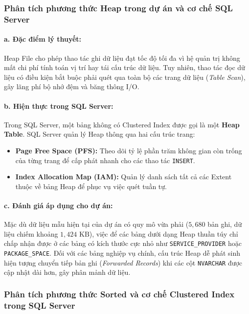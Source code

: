 \subsubsection{Phân tích phương thức Heap trong dự án và cơ chế SQL Server}

\paragraph{a. Đặc điểm lý thuyết:}
Heap File cho phép thao tác ghi dữ liệu đạt tốc độ tối đa vì hệ quản trị không mất chi phí tính toán vị trí hay tái cấu trúc dữ liệu. Tuy nhiên, thao tác đọc dữ liệu có điều kiện bắt buộc phải quét qua toàn bộ các trang dữ liệu (\textit{Table Scan}), gây lãng phí bộ nhớ đệm và băng thông I/O.

\paragraph{b. Hiện thực trong SQL Server:}
Trong SQL Server, một bảng không có Clustered Index được gọi là một \textbf{Heap Table}. SQL Server quản lý Heap thông qua hai cấu trúc trang:
\begin{itemize}
    \item \textbf{Page Free Space (PFS):} Theo dõi tỷ lệ phần trăm không gian còn trống của từng trang để cấp phát nhanh cho các thao tác \texttt{INSERT}.
    \item \textbf{Index Allocation Map (IAM):} Quản lý danh sách tất cả các Extent thuộc về bảng Heap để phục vụ việc quét tuần tự.
\end{itemize}

\paragraph{c. Đánh giá áp dụng cho dự án:}
Mặc dù dữ liệu mẫu hiện tại của dự án có quy mô vừa phải ($5{,}680$ bản ghi, dữ liệu chiếm khoảng $1{,}424\text{ KB}$), việc để các bảng dưới dạng Heap thuần túy chỉ chấp nhận được ở các bảng có kích thước cực nhỏ như \texttt{SERVICE\_PROVIDER} hoặc \texttt{PACKAGE\_SPACE}. Đối với các bảng nghiệp vụ chính, cấu trúc Heap dễ phát sinh hiện tượng chuyển tiếp bản ghi (\textit{Forwarded Records}) khi các cột \texttt{NVARCHAR} được cập nhật dài hơn, gây phân mảnh dữ liệu.

\subsubsection{Phân tích phương thức Sorted và cơ chế Clustered Index trong SQL Server}

